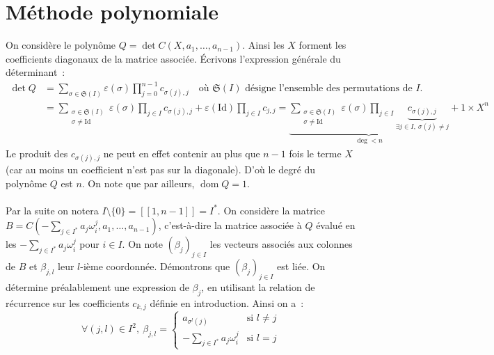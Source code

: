 \documentclass{article}
\DeclareMathOperator{\dom}{dom}
\begin{document}
  \section*{Méthode polynomiale}

  On considère le polynôme $Q = \det C(X, a_1, \dots, a_{n-1})$. Ainsi les $X$ forment les coefficients diagonaux de la matrice associée. Écrivons l'expression générale du déterminant~:
  \begin{align*}
    \det Q &= \sum_{\sigma\in\mathfrak{S}(I)} \varepsilon(\sigma) \prod_{j = 0}^{n - 1} c_{\sigma(j),j} \quad\text{où $\mathfrak{S}(I)$ désigne l'ensemble des permutations de $I$.} \\
    &= \sum_{\substack{\sigma\in\mathfrak{S}(I) \\ \sigma \neq \mathrm{Id}}} \varepsilon(\sigma) \prod_{j\in I} c_{\sigma(j),j} + \varepsilon(\mathrm{Id}) \prod_{j\in I} c_{j,j}
    = \underbrace{\sum_{\substack{\sigma\in\mathfrak{S}(I) \\ \sigma \neq \mathrm{Id}}} \varepsilon(\sigma) \prod_{j\in I} \underbrace{c_{\sigma(j),j}}_{\exists j\in I,\: \sigma(j) \neq j}}_{\deg < n} + 1 \times X^n
  \end{align*}
  Le produit des $c_{\sigma(j), j}$ ne peut en effet contenir au plus que $n - 1$ fois le terme $X$ (car au moins un coefficient n'est pas sur la diagonale). D'où le degré du polynôme $Q$ est $n$. On note que par ailleurs, $\dom Q = 1$.

  \paragraph{} Par la suite on notera $I\setminus\{0\} = [\![1, n-1]\!] = I^*$. On considère la matrice $B = C \left(-\sum_{j\in I^*} a_j \omega_i^j, a_1, \dots, a_{n-1}\right)$, c'est-à-dire la matrice associée à $Q$ évalué en les $-\sum_{j\in I^*} a_j \omega_i^j$ pour $i\in I$. On note $(\beta_j)_{j\in I}$ les vecteurs associés aux colonnes de $B$ et $\beta_{j, l}$ leur $l$-ième coordonnée. Démontrons que $(\beta_j)_{j\in I}$ est liée. On détermine préalablement une expression de $\beta_j$, en utilisant la relation de récurrence sur les coefficients $c_{k, j}$ définie en introduction. Ainsi on a~:
  \[
    \forall (j, l)\in I^2,\: \beta_{j, l} =
    \begin{cases}
      a_{\sigma^l(j)} & \text{si } l \neq j \\
      -\sum_{j\in I^*} a_j \omega_i^j & \text{si } l = j
    \end{cases}
  \]
\end{document}
